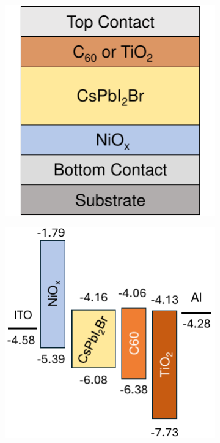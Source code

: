\begin{figure}[htbp]
    \centering
    \begin{subfigure}[t]{0.35\textwidth} %
        \centering
        \includegraphics[width=\textwidth]{chapters/material_properties/images/stack_cross_section.pdf} %
        \caption{}
        \label{}
    \end{subfigure}
    \hfill %
    \begin{subfigure}[t]{0.45\textwidth} %
        \centering
        \includegraphics[width=\textwidth]{chapters/material_properties/images/energy_landscape.pdf} %
        \caption{}
        \label{}
    \end{subfigure}


\end{figure}
